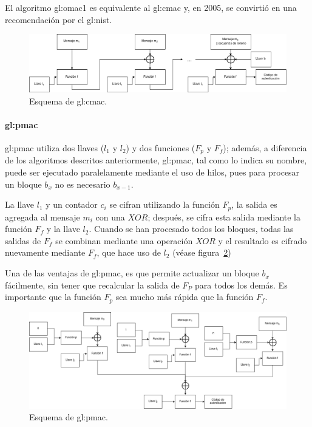 El algoritmo \gls{gl:omac}1 es equivalente al \gls{gl:cmac} y, en 2005, se
convirtió en una recomendación por el \gls{gl:nist}.

\begin{figure}
  \begin{center}
    \includegraphics[width=0.9\linewidth]{diagramas/cmac.png}
    \caption{Esquema de \gls{gl:cmac}.}
    \label{mac:cmac}
  \end{center}
\end{figure}

\paragraph{\acrlong{gl:pmac}}
\Gls{gl:pmac} utiliza dos llaves ($l_1$ y $l_2$) y dos funciones
($F_p$ y $F_f$); además, a diferencia de los algoritmos descritos anteriormente,
\gls{gl:pmac}, tal como lo indica su nombre, puede ser ejecutado paralelamente
mediante el uso de hilos, pues para procesar un bloque $b_x$ no es necesario
$b_{x-1}$.

La llave $l_1$ y un contador $c_i$ se cifran utilizando la función
$F_p$, la salida es agregada al mensaje $m_i$ con una $XOR$; después, se cifra
esta salida mediante la función $F_f$ y la llave $l_2$. Cuando se han procesado
todos los bloques, todas las salidas de $F_f$ se combinan mediante una operación
$XOR$ y el resultado es cifrado nuevamente mediante $F_f$, que hace uso de
$l_2$ (véase figura~\ref{mac:pmac})

Una de las ventajas de \gls{gl:pmac}, es que permite actualizar un bloque $b_x$
fácilmente, sin tener que recalcular la salida de $F_P$ para todos los demás.
Es importante que la función $F_p$ sea mucho más rápida que la función $F_f$.

\begin{figure}
  \begin{center}
    \includegraphics[width=0.9\linewidth]{diagramas/pmac.png}
    \caption{Esquema de \gls{gl:pmac}.}
    \label{mac:pmac}
  \end{center}
\end{figure}

